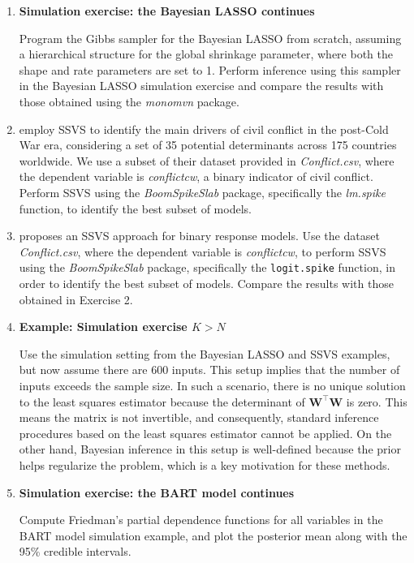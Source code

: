 \begin{enumerate}
	\item \textbf{Simulation exercise: the Bayesian LASSO continues}
	
	Program the Gibbs sampler for the Bayesian LASSO from scratch, assuming a hierarchical structure for the global shrinkage parameter, where both the shape and rate parameters are set to 1. Perform inference using this sampler in the Bayesian LASSO simulation exercise and compare the results with those obtained using the \textit{monomvn} package.
	
	\item \cite{jetter2022postcold} employ SSVS to identify the main drivers of civil conflict in the post-Cold War era, considering a set of 35 potential determinants across 175 countries worldwide. We use a subset of their dataset provided in \textit{Conflict.csv}, where the dependent variable is \textit{conflictcw}, a binary indicator of civil conflict. Perform SSVS using the \textit{BoomSpikeSlab} package, specifically the \textit{lm.spike} function, to identify the best subset of models.
	
	\item \cite{tuchler2008bayesian} proposes an SSVS approach for binary response models. Use the dataset \textit{Conflict.csv}, where the dependent variable is \textit{conflictcw}, to perform SSVS using the \textit{BoomSpikeSlab} package, specifically the \texttt{logit.spike} function, in order to identify the best subset of models. Compare the results with those obtained in Exercise 2.
	
	\item \textbf{Example: Simulation exercise $K > N$}
	
	Use the simulation setting from the Bayesian LASSO and SSVS examples, but now assume there are 600 inputs. This setup implies that the number of inputs exceeds the sample size. In such a scenario, there is no unique solution to the least squares estimator because the determinant of $\mathbf{W}^{\top} \mathbf{W}$ is zero. This means the matrix is not invertible, and consequently, standard inference procedures based on the least squares estimator cannot be applied. On the other hand, Bayesian inference in this setup is well-defined because the prior helps regularize the problem, which is a key motivation for these methods.
	
	\item \textbf{Simulation exercise: the BART model continues} 
	
	Compute Friedman’s partial dependence functions \cite{friedman2001greedy} for all variables in the BART model simulation example, and plot the posterior mean along with the 95\% credible intervals.
	

\end{enumerate}
